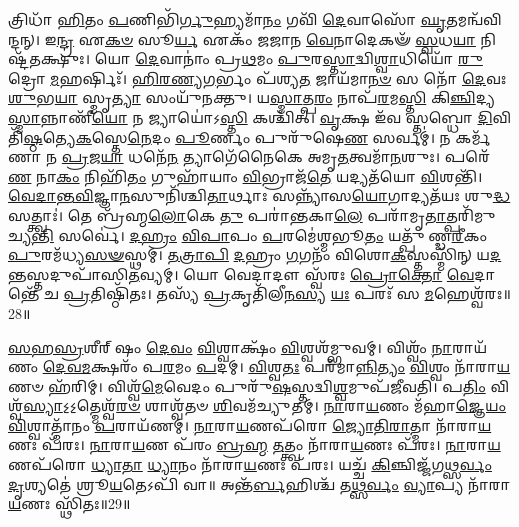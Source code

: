 𑌤𑍍𑌰𑌿𑌧𑌾᳴ \ul{𑌹𑌿}\-𑌤𑌂 \ul{𑌪}\-𑌣𑌿𑌭𑌿᳴\-\ul{𑌰𑍍𑌗𑍁}\-𑌹𑍍𑌯𑌮𑌾᳴\-\ul{𑌨𑌂} 𑌗𑌵𑌿᳴ \ul{𑌦𑍇}\-𑌵𑌾𑌸𑍋᳴ \ul{𑌘𑍃}\-𑌤𑌮𑌨𑍍𑌵᳴𑌵𑌿𑌨𑍍𑌦𑌨𑍍। 
𑌇\-\ul{𑌨𑍍𑌦𑍍𑌰} 𑌏\-\ul{𑌕}\-\-\ul{𑍞} 𑌸𑍂\-\ul{𑌰𑍍𑌯} 𑌏𑌕𑌂᳴ 𑌜𑌜𑌾𑌨 \ul{𑌵𑍇}\-𑌨𑌾𑌦𑍇𑌕𑍟᳴ \ul{𑌸𑍍𑌵}\-𑌧\-\ul{𑌯𑌾} 𑌨𑌿𑌷𑍍𑌟᳴𑌤𑌕𑍍𑌷𑍁𑌃। 
𑌯𑍋 \ul{𑌦𑍇}\-𑌵𑌾𑌨𑌾𑌂॑ 𑌪𑍍𑌰\-\ul{𑌥}\-𑌮𑌂 \ul{𑌪𑍁}\-𑌰\-\ul{𑌸𑍍𑌤𑌾}\-𑌦𑍍𑌵𑌿\-\ul{𑌶𑍍𑌵𑌾}\-𑌧𑌿𑌯𑍋᳴ \ul{𑌰𑍁}\-𑌦𑍍𑌰𑍋 \ul{𑌮}\-𑌹𑌰𑍍\mbox{}𑌷𑌿𑌃᳴। 
\-\ul{𑌹𑌿}\-\-\ul{𑌰}\-\-\ul{𑌣𑍍𑌯}\-\-\ul{𑌗}\-𑌰𑍍𑌭𑌂 𑌪᳴𑌶𑍍𑌯\-\ul{𑌤} 𑌜𑌾𑌯᳴𑌮𑌾\-\ul{𑌨}\-\-\ul{𑍞} 𑌸 𑌨𑍋᳴ \ul{𑌦𑍇}\-𑌵𑌃 \ul{𑌶𑍁}\-𑌭\-\ul{𑌯𑌾} 𑌸𑍍𑌮𑍃\-\ul{𑌤𑍍𑌯𑌾} 𑌸𑌂𑌯𑍁᳴𑌨𑌕𑍍𑌤𑍁। 
𑌯\-\ul{𑌸𑍍𑌮𑌾}\-𑌤𑍍𑌪\-\ul{𑌰𑌂} 𑌨𑌾𑌪᳴\-\ul{𑌰}\-𑌮\-\ul{𑌸𑍍𑌤𑌿} 𑌕𑌿\-\ul{𑌞𑍍𑌚𑌿}\-𑌦𑍍𑌯\-\ul{𑌸𑍍𑌮𑌾}\-𑌨𑍍𑌨𑌾𑌣𑍀᳴\-\ul{𑌯𑍋} 𑌨 𑌜𑍍𑌯𑌾𑌯𑍋॑𑌽\-\ul{𑌸𑍍𑌤𑌿} 𑌕𑌶𑍍𑌚𑌿᳴𑌤𑍍। 
\-\ul{𑌵𑍃}\-𑌕𑍍𑌷 𑌇᳴𑌵 𑌸𑍍𑌤𑌬𑍍𑌧𑍋 \ul{𑌦𑌿}\-𑌵𑌿 𑌤𑌿᳴\-\ul{𑌷𑍍𑌠}\-𑌤𑍍𑌯𑍇\-\ul{𑌕}\-𑌸𑍍𑌤𑍇\-\ul{𑌨𑍇}\-𑌦𑌂 \ul{𑌪𑍂}\-𑌰𑍍𑌣𑌂 𑌪𑍁𑌰𑍁᳴𑌷𑍇\-\ul{𑌣} 𑌸𑌰𑍍𑌵𑌮𑍍॑। 
𑌨 𑌕𑌰𑍍𑌮᳴𑌣𑌾 𑌨 \ul{𑌪𑍍𑌰}\-𑌜\-\ul{𑌯𑌾} 𑌧𑌨𑍇᳴\-\ul{𑌨} 𑌤𑍍𑌯𑌾𑌗𑍇᳴𑌨𑍈𑌕𑍇 𑌅𑌮𑍃\-\ul{𑌤}\-𑌤𑍍𑌵𑌮𑌾᳴\-\ul{𑌨}\-𑌶𑍁𑌃। 
𑌪𑌰𑍇᳴\-\ul{𑌣} 𑌨𑌾\-\ul{𑌕𑌂} 𑌨𑌿𑌹𑌿᳴\-\ul{𑌤𑌂} 𑌗𑍁𑌹𑌾᳴𑌯𑌾𑌂 \ul{𑌵𑌿}\-𑌭𑍍𑌰𑌾𑌜᳴\-\ul{𑌤𑍇} 𑌯𑌦𑍍𑌯𑌤᳴𑌯𑍋 \ul{𑌵𑌿}\-𑌶𑌨𑍍𑌤𑌿᳴। 
\-\ul{𑌵𑍇}\-\-\ul{𑌦𑌾}\-\-\ul{𑌨𑍍𑌤}\-\-\ul{𑌵𑌿}\-𑌜𑍍𑌞𑌾\-\ul{𑌨}\-𑌸𑍁𑌨𑌿᳴𑌶𑍍𑌚𑌿\-\ul{𑌤𑌾}\-𑌰𑍍𑌥𑌾𑌃 𑌸𑌨𑍍𑌨𑍍𑌯𑌾᳴𑌸\-\ul{𑌯𑍋}\-𑌗𑌾𑌦𑍍𑌯𑌤᳴𑌯𑌃 𑌶𑍁\-\ul{𑌦𑍍𑌧}\-𑌸𑌤𑍍𑌤𑍍𑌵𑌾𑌃॑। 
𑌤𑍇 𑌬𑍍𑌰᳴𑌹𑍍𑌮\-\ul{𑌲𑍋}\-𑌕𑍇 \ul{𑌤𑍁} 𑌪𑌰𑌾॑𑌨𑍍𑌤𑌕𑌾\-\ul{𑌲𑍇} 𑌪𑌰𑌾᳴𑌮𑍃\-\ul{𑌤𑌾}\-𑌤𑍍𑌪𑌰𑌿᳴𑌮𑍁𑌚𑍍𑌯\-\ul{𑌨𑍍𑌤𑌿} 𑌸𑌰𑍍𑌵𑍇॑। 
\-\ul{𑌦}\-\-\ul{𑌹𑍍𑌰𑌂} \ul{𑌵𑌿}\-\-\ul{𑌪𑌾}\-𑌪𑌂 \ul{𑌪}\-𑌰𑌮𑍇॑𑌶𑍍𑌮𑌭𑍂\-\ul{𑌤𑌂} 𑌯𑌤𑍍𑌪𑍁᳴𑌣𑍍𑌡\-\ul{𑌰𑍀}\-𑌕𑌂 \ul{𑌪𑍁}\-𑌰𑌮᳴𑌧𑍍𑌯\-\ul{𑌸}\-\-\ul{𑍟}\-𑌸𑍍𑌥𑌮𑍍। 
\-\ul{𑌤}\-\-\ul{𑌤𑍍𑌰𑌾}\-\-\ul{𑌪𑌿} \ul{𑌦}\-𑌹𑍍𑌰𑌂 \ul{𑌗}\-𑌗𑌨𑌂᳴ 𑌵𑌿𑌶𑍋\-\ul{𑌕}\-𑌸𑍍𑌤𑌸𑍍𑌮𑌿᳴𑌨𑍍 𑌯\-\ul{𑌦}\-𑌨𑍍𑌤𑌸𑍍𑌤𑌦𑍁𑌪𑌾᳴𑌸𑌿\-\ul{𑌤}\-𑌵𑍍𑌯𑌮𑍍। 
𑌯𑍋 𑌵𑍇𑌦𑌾𑌦𑍗 𑌸𑍍𑌵᳴𑌰𑌃 \ul{𑌪𑍍𑌰𑍋}\-\-\ul{𑌕𑍍𑌤𑍋} \ul{𑌵𑍇}\-𑌦𑌾𑌨𑍍𑌤𑍇᳴ 𑌚 \ul{𑌪𑍍𑌰}\-𑌤𑌿𑌷𑍍𑌠𑌿᳴𑌤𑌃। 
𑌤𑌸𑍍𑌯᳴ \ul{𑌪𑍍𑌰}\-𑌕𑍃𑌤𑌿᳴𑌲𑍀\-\ul{𑌨}\-\-\ul{𑌸𑍍𑌯} \ul{𑌯𑌃} 𑌪𑌰𑌃᳴ 𑌸 \ul{𑌮}\-𑌹𑍇𑌶𑍍𑌵᳴𑌰𑌃॥28॥
\anuvakamend

\-\ul{𑌸}\-\-\ul{𑌹}\-\-\ul{𑌸𑍍𑌰}\-𑌶𑍀𑌰𑍍‌𑌷𑌂 \ul{𑌦𑍇}\-\-\ul{𑌵𑌂} \ul{𑌵𑌿}\-𑌶𑍍𑌵𑌾𑌕𑍍𑌷𑌂᳴ \ul{𑌵𑌿}\-𑌶𑍍𑌵𑌶᳴𑌮𑍍𑌭𑍁𑌵𑌮𑍍। 
𑌵𑌿𑌶𑍍𑌵𑌂᳴ \ul{𑌨𑌾}\-𑌰𑌾𑌯᳴𑌣𑌂 \ul{𑌦𑍇}\-\-\ul{𑌵}\-\-\ul{𑌮}\-𑌕𑍍𑌷𑌰𑌂᳴ 𑌪\-\ul{𑌰}\-𑌮𑌂 \ul{𑌪}\-𑌦𑌮𑍍। 
\-\ul{𑌵𑌿}\-𑌶𑍍𑌵\-\ul{𑌤𑌃} 𑌪𑌰᳴𑌮𑌾\-\ul{𑌨𑍍𑌨𑌿}\-\-\ul{𑌤𑍍𑌯𑌂} \ul{𑌵𑌿}\-𑌶𑍍𑌵𑌂 𑌨𑌾᳴𑌰𑌾\-\ul{𑌯}\-𑌣𑍞 𑌹᳴𑌰𑌿𑌮𑍍। 
𑌵𑌿𑌶𑍍𑌵᳴\-\ul{𑌮𑍇}\-𑌵𑍇𑌦𑌂 𑌪𑍁𑌰𑍁᳴\-\ul{𑌷}\-𑌸𑍍𑌤𑌦𑍍𑌵𑌿\-\ul{𑌶𑍍𑌵}\-𑌮𑍁𑌪᳴𑌜𑍀𑌵𑌤𑌿। 
𑌪\-\ul{𑌤𑌿𑌂} 𑌵𑌿𑌶𑍍𑌵᳴\-\ul{𑌸𑍍𑌯𑌾}\-𑌽॒𑌽॒𑌤𑍍𑌮𑍇𑌶𑍍𑌵᳴\-\ul{𑌰}\-\-\ul{𑍞} 𑌶𑌾𑌶𑍍𑌵᳴𑌤𑍞 \ul{𑌶𑌿}\-𑌵𑌮᳴𑌚𑍍𑌯𑍁𑌤𑌮𑍍। 
\-\ul{𑌨𑌾}\-𑌰𑌾\-\ul{𑌯}\-𑌣𑌂 𑌮᳴𑌹𑌾\-\ul{𑌜𑍍𑌞𑍇}\-\-\ul{𑌯𑌂} \ul{𑌵𑌿}\-𑌶𑍍𑌵𑌾𑌤𑍍𑌮𑌾᳴𑌨𑌂 \ul{𑌪}\-𑌰𑌾𑌯᳴𑌣𑌮𑍍। 
\-\ul{𑌨𑌾}\-𑌰𑌾\-\ul{𑌯}\-𑌣𑌪᳴𑌰𑍋 \ul{𑌜𑍍𑌯𑍋}\-\-\ul{𑌤𑌿}\-\-\ul{𑌰𑌾}\-𑌤𑍍𑌮𑌾 𑌨𑌾᳴𑌰𑌾\-\ul{𑌯}\-𑌣𑌃 𑌪᳴𑌰𑌃। 
\-\ul{𑌨𑌾}\-𑌰𑌾\-\ul{𑌯}\-𑌣 𑌪᳴𑌰𑌂 \ul{𑌬𑍍𑌰}\-\-\ul{𑌹𑍍𑌮} \ul{𑌤}\-𑌤𑍍𑌤𑍍𑌵𑌂 𑌨𑌾᳴𑌰𑌾\-\ul{𑌯}\-𑌣𑌃 𑌪᳴𑌰𑌃। 
\-\ul{𑌨𑌾}\-𑌰𑌾\-\ul{𑌯}\-𑌣𑌪᳴𑌰𑍋 \ul{𑌧𑍍𑌯𑌾}\-\-\ul{𑌤𑌾} \ul{𑌧𑍍𑌯𑌾}\-𑌨𑌂 𑌨𑌾᳴𑌰𑌾\-\ul{𑌯}\-𑌣𑌃 𑌪᳴𑌰𑌃। 
𑌯𑌚𑍍𑌚᳴ \ul{𑌕𑌿}\-𑌞𑍍𑌚𑌿𑌜𑍍𑌜᳴𑌗\-\ul{𑌥𑍍𑌸}\-\-\ul{𑌰𑍍𑌵𑌂} \ul{𑌦𑍃}\-𑌶𑍍𑌯𑌤𑍇॑ 𑌶𑍍𑌰𑍂\-\ul{𑌯}\-𑌤𑍇𑌽𑌪𑌿᳴ 𑌵𑌾॥ 
𑌅𑌨𑍍𑌤᳴\-\ul{𑌰𑍍𑌬}\-𑌹𑌿𑌶𑍍𑌚᳴ 𑌤\-\ul{𑌥𑍍𑌸}\-\-\ul{𑌰𑍍𑌵𑌂} \ul{𑌵𑍍𑌯𑌾}\-𑌪𑍍𑌯 𑌨𑌾᳴𑌰𑌾\-\ul{𑌯}\-𑌣𑌃 𑌸𑍍𑌥𑌿᳴𑌤𑌃॥29॥

